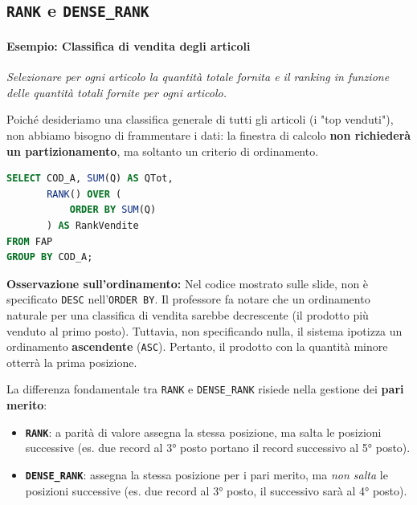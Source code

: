 \subsection{\texttt{RANK} e \texttt{DENSE\_RANK}}

\paragraph{Esempio: Classifica di vendita degli articoli}
\textit{Selezionare per ogni articolo la quantità totale fornita e il ranking in funzione delle quantità totali fornite per ogni articolo.}

Poiché desideriamo una classifica generale di tutti gli articoli (i "top venduti"), non abbiamo bisogno di frammentare i dati: la finestra di calcolo \textbf{non richiederà un partizionamento}, ma soltanto un criterio di ordinamento.

\begin{lstlisting}[language=SQL, basicstyle=\small\ttfamily, keywordstyle=\bfseries\color{blue}, frame=single]
SELECT COD_A, SUM(Q) AS QTot,
       RANK() OVER (
           ORDER BY SUM(Q)
       ) AS RankVendite
FROM FAP
GROUP BY COD_A;
\end{lstlisting}

\textbf{Osservazione sull'ordinamento:} Nel codice mostrato sulle slide, non è specificato \texttt{DESC} nell'\texttt{ORDER BY}. Il professore fa notare che un ordinamento naturale per una classifica di vendita sarebbe decrescente (il prodotto più venduto al primo posto). Tuttavia, non specificando nulla, il sistema ipotizza un ordinamento \textbf{ascendente} (\texttt{ASC}). Pertanto, il prodotto con la quantità minore otterrà la prima posizione.

La differenza fondamentale tra \texttt{RANK} e \texttt{DENSE\_RANK} risiede nella gestione dei \textbf{pari merito}:
\begin{itemize}
    \item \textbf{\texttt{RANK}}: a parità di valore assegna la stessa posizione, ma salta le posizioni successive (es. due record al 3° posto portano il record successivo al 5° posto).
    \item \textbf{\texttt{DENSE\_RANK}}: assegna la stessa posizione per i pari merito, ma \textit{non salta} le posizioni successive (es. due record al 3° posto, il successivo sarà al 4° posto).
\end{itemize}

